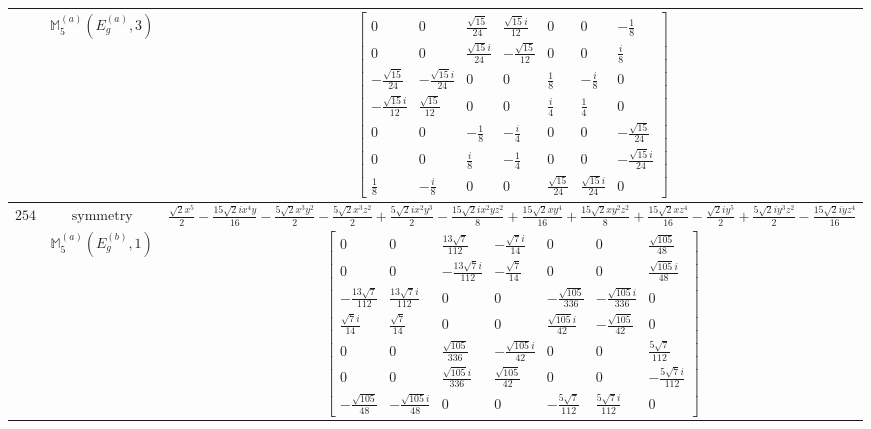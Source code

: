 \documentclass[fleqn,8pt,landscape]{jsarticle}
\begin{document}
\begin{longtable}{ccc}
$  $ & $ \mathbb{M}_{5}^{(a)}(E_{g}^{(a)},3) $ & $ \begin{bmatrix} 0 & 0 & \frac{\sqrt{15}}{24} & \frac{\sqrt{15} i}{12} & 0 & 0 & - \frac{1}{8} \\ 0 & 0 & \frac{\sqrt{15} i}{24} & - \frac{\sqrt{15}}{12} & 0 & 0 & \frac{i}{8} \\ - \frac{\sqrt{15}}{24} & - \frac{\sqrt{15} i}{24} & 0 & 0 & \frac{1}{8} & - \frac{i}{8} & 0 \\ - \frac{\sqrt{15} i}{12} & \frac{\sqrt{15}}{12} & 0 & 0 & \frac{i}{4} & \frac{1}{4} & 0 \\ 0 & 0 & - \frac{1}{8} & - \frac{i}{4} & 0 & 0 & - \frac{\sqrt{15}}{24} \\ 0 & 0 & \frac{i}{8} & - \frac{1}{4} & 0 & 0 & - \frac{\sqrt{15} i}{24} \\ \frac{1}{8} & - \frac{i}{8} & 0 & 0 & \frac{\sqrt{15}}{24} & \frac{\sqrt{15} i}{24} & 0 \end{bmatrix} $ \\ \hline
$ 254 $ & $ \text{symmetry} $ & $ \frac{\sqrt{2} x^{5}}{2} - \frac{15 \sqrt{2} i x^{4} y}{16} - \frac{5 \sqrt{2} x^{3} y^{2}}{2} - \frac{5 \sqrt{2} x^{3} z^{2}}{2} + \frac{5 \sqrt{2} i x^{2} y^{3}}{2} - \frac{15 \sqrt{2} i x^{2} y z^{2}}{8} + \frac{15 \sqrt{2} x y^{4}}{16} + \frac{15 \sqrt{2} x y^{2} z^{2}}{8} + \frac{15 \sqrt{2} x z^{4}}{16} - \frac{\sqrt{2} i y^{5}}{2} + \frac{5 \sqrt{2} i y^{3} z^{2}}{2} - \frac{15 \sqrt{2} i y z^{4}}{16} $ \\
$  $ & $ \mathbb{M}_{5}^{(a)}(E_{g}^{(b)},1) $ & $ \begin{bmatrix} 0 & 0 & \frac{13 \sqrt{7}}{112} & - \frac{\sqrt{7} i}{14} & 0 & 0 & \frac{\sqrt{105}}{48} \\ 0 & 0 & - \frac{13 \sqrt{7} i}{112} & - \frac{\sqrt{7}}{14} & 0 & 0 & \frac{\sqrt{105} i}{48} \\ - \frac{13 \sqrt{7}}{112} & \frac{13 \sqrt{7} i}{112} & 0 & 0 & - \frac{\sqrt{105}}{336} & - \frac{\sqrt{105} i}{336} & 0 \\ \frac{\sqrt{7} i}{14} & \frac{\sqrt{7}}{14} & 0 & 0 & \frac{\sqrt{105} i}{42} & - \frac{\sqrt{105}}{42} & 0 \\ 0 & 0 & \frac{\sqrt{105}}{336} & - \frac{\sqrt{105} i}{42} & 0 & 0 & \frac{5 \sqrt{7}}{112} \\ 0 & 0 & \frac{\sqrt{105} i}{336} & \frac{\sqrt{105}}{42} & 0 & 0 & - \frac{5 \sqrt{7} i}{112} \\ - \frac{\sqrt{105}}{48} & - \frac{\sqrt{105} i}{48} & 0 & 0 & - \frac{5 \sqrt{7}}{112} & \frac{5 \sqrt{7} i}{112} & 0 \end{bmatrix} $ \\ \hline

\end{longtable}
\end{document}
